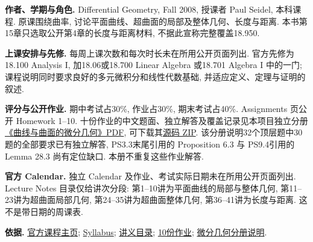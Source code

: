 \par\addvspace{9pt}
\par\nobreak\vspace{4pt}

\textbf{作者、学期与角色.} Differential Geometry, Fall 2008, 授课者 Paul Seidel, 本科课程. 原课围绕曲率, 讨论平面曲线、超曲面的局部及整体几何、长度与距离. 本书第15章只选取公开第4章的长度与距离材料, 不据此宣称完整覆盖18.950.

\textbf{上课安排与先修.} 每周上课次数和每次时长未在所用公开页面列出. 官方先修为18.100 Analysis I, 加18.06或18.700 Linear Algebra 或18.701 Algebra I 中的一门; 课程说明同时要求良好的多元微积分和线性代数基础, 并适应定义、定理与证明的叙述.

\textbf{评分与公开作业.} 期中考试占30\%, 作业占30\%, 期末考试占40\%. Assignments 页公开 Homework 1--10. 十份作业的中文题面、独立解答及覆盖记录见本项目独立分册\href{https://github.com/xhc144/mit-ocw-notes/blob/80b9182650861c1a4830fb812032abbc93a429e7/subjects/differential-geometry/differential-geometry.pdf}{《曲线与曲面的微分几何》PDF}, 可下载其\href{https://github.com/xhc144/mit-ocw-notes/blob/80b9182650861c1a4830fb812032abbc93a429e7/subjects/differential-geometry/differential-geometry-source.zip}{源码 ZIP}. 该分册说明32个顶层题中30题的全部要求已有独立解答, PS3.3末尾引用的 Proposition 6.3 与 PS9.4引用的 Lemma 28.3 尚有定位缺口. 本册不重复这些作业解答.

\textbf{官方 Calendar.} 独立 Calendar 及作业、考试实际日期未在所用公开页面列出. Lecture Notes 目录仅给讲次分段: 第1--10讲为平面曲线的局部与整体几何, 第11--23讲为超曲面局部几何, 第24--35讲为超曲面整体几何, 第36--41讲为长度与距离. 这不是带日期的周课表.

\textbf{依据.} \href{https://ocw.mit.edu/courses/18-950-differential-geometry-fall-2008/}{官方课程主页}; \href{https://ocw.mit.edu/courses/18-950-differential-geometry-fall-2008/pages/syllabus/}{Syllabus}; \href{https://ocw.mit.edu/courses/18-950-differential-geometry-fall-2008/pages/lecture-notes/}{讲义目录}; \href{https://ocw.mit.edu/courses/18-950-differential-geometry-fall-2008/pages/assignments/}{10份作业}; \href{https://github.com/xhc144/mit-ocw-notes/blob/80b9182650861c1a4830fb812032abbc93a429e7/subjects/differential-geometry/README.md}{微分几何分册说明}.

\par\addvspace{9pt}
\par\nobreak\vspace{4pt}

